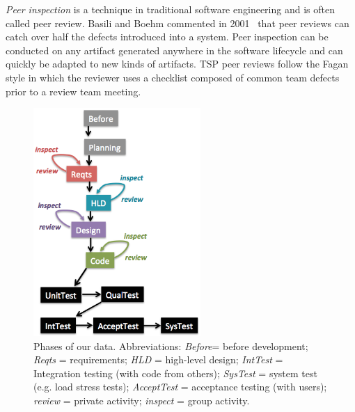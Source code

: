   
 
{\em Peer inspection} is a  technique in
traditional software engineering and is often called peer review.
 Basili and Boehm   commented in 2001~\cite{boehm01} 
that peer reviews can catch over half the defects introduced into a system.
Peer inspection can be conducted on any artifact generated anywhere in the software
lifecycle and can quickly be adapted to new kinds of artifacts. TSP peer reviews follow the Fagan style in which the reviewer uses a checklist composed of common team defects prior to a review team meeting. 


\begin{figure}[!t]  
\begin{center}
\includegraphics[width=2.5in]{img/waterfall-v3.png}  
\end{center}
\caption{Phases of our data.
Abbreviations: \newline
{\em Before}= before development;\newline
{\em Reqts}	  = requirements;\newline
{\em HLD}	  = high-level design;\newline
{\em IntTest} = Integration testing (with code from others);\newline
{\em SysTest} = system test (e.g. load stress tests);\newline
{\em AcceptTest}  = acceptance testing (with users);\newline
{\em review}        = private activity;\newline
{\em inspect}        = group activity.}
\label{fig:waterfall}
\end{figure}


